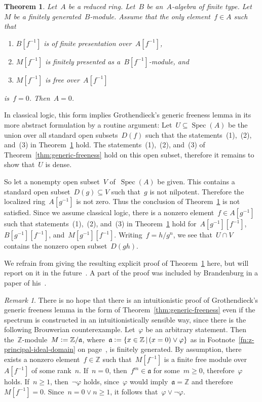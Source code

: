 \documentclass[10pt,reqno,a4paper]{amsbook}
\theoremstyle{definition}
\theoremstyle{plain}
\newtheorem{thm}[defn]{Theorem}
\theoremstyle{remark}
\newtheorem{rem}[defn]{Remark}
\newcommand{\ZZ}{\mathbb{Z}}
\newcommand{\aaa}{\mathfrak{a}}
\DeclareMathOperator{\Spec}{Spec}
\newcommand{\?}{\,{:}\,}
\renewcommand{\_}{\mathpunct{.}\,}
\newcommand{\defeq}{\vcentcolon=}
\begin{document}
\begin{thm}\label{thm:generic-freeness-constructively}
Let~$A$ be a reduced ring. Let~$B$ be an~$A$-algebra of finite type.
Let~$M$ be a finitely generated~$B$-module. Assume that the only element~$f \in
A$ such that
\begin{enumerate}
\item $B[f^{-1}]$ is of finite presentation over~$A[f^{-1}]$,
\item $M[f^{-1}]$ is finitely presented as a~$B[f^{-1}]$-module, and
\item $M[f^{-1}]$ is free over~$A[f^{-1}]$
\end{enumerate}
is~$f = 0$. Then~$A = 0$.
\end{thm}

In classical logic, this form implies Grothendieck's generic freeness lemma in its more abstract
formulation by a routine argument: Let~$U \subseteq \Spec(A)$ be the union over
all standard open subsets~$D(f)$ such that the statements~(1),~(2), and~(3) in
Theorem~\ref{thm:generic-freeness-constructively} hold. The
statements~(1),~(2), and~(3) of Theorem~\ref{thm:generic-freeness} hold on this
open subset, therefore it remains to show that~$U$ is dense.

So let a nonempty open subset~$V$ of~$\Spec(A)$ be given. This
contains a standard open subset~$D(g) \subseteq V$ such that~$g$ is not
nilpotent. Therefore the localized ring~$A[g^{-1}]$ is not zero. Thus the
conclusion of Theorem~\ref{thm:generic-freeness-constructively} is not satisfied.
Since we assume classical logic, there is a nonzero element~$f \in A[g^{-1}]$
such that statements~(1),~(2), and~(3) in
Theorem~\ref{thm:generic-freeness-constructively} hold for~$A[g^{-1}][f^{-1}]$,
$B[g^{-1}][f^{-1}]$, and~$M[g^{-1}][f^{-1}]$.
Writing~$f = h/g^n$, we see that~$U \cap V$ contains the nonzero open
subset~$D(gh)$.

We refrain from giving the resulting explicit proof of
Theorem~\ref{thm:generic-freeness-constructively} here, but will report on it
in the future~\cite{blechschmidt:generic-freeness}. A part of the proof was
included by Brandenburg in a paper of his~\cite{brandenburg:schur}.

\begin{rem}There is no hope that there is an intuitionistic proof of
Gro\-then\-dieck's generic freeness lemma in the form of
Theorem~\ref{thm:generic-freeness} even if the spectrum is constructed in an
intuitionistically sensible way, since there is the following Brouwerian
counterexample. Let~$\varphi$ be an arbitrary statement. Then
the~$\ZZ$-module~$M \defeq \ZZ/\aaa$, where~$\aaa \defeq \{ x \in \ZZ \,|\, (x
= 0) \vee \varphi \}$ as in Footnote~\ref{fn:z-principal-ideal-domain} on
page~\pageref{fn:z-principal-ideal-domain}, is finitely generated. By
assumption, there exists a nonzero element~$f \in \ZZ$ such that~$M[f^{-1}]$ is
a finite free module over~$A[f^{-1}]$ of some rank~$n$. If~$n = 0$, then~$f^m
\in \aaa$ for some~$m \geq 0$, therefore~$\varphi$ holds. If~$n \geq 1$,
then~$\neg\varphi$ holds, since~$\varphi$ would imply~$\aaa = \ZZ$ and
therefore~$M[f^{-1}] = 0$. Since~$n = 0 \vee n \geq 1$, it follows
that~$\varphi \vee \neg\varphi$.
\end{rem}
\end{document}
